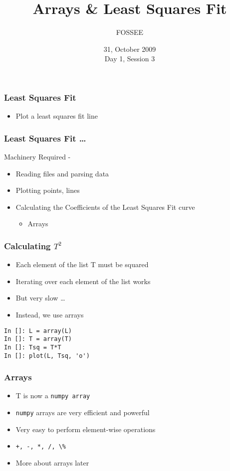 \documentclass[14pt,compress]{beamer}
\title[]{Arrays \& Least Squares Fit}
\author[FOSSEE] {FOSSEE}
\institute[IIT Bombay] {Department of Aerospace Engineering\\IIT Bombay}
\date[] {31, October 2009\\Day 1, Session 3}
\newcommand{\typ}[1]{\lstinline{#1}}
\begin{document}
\begin{frame}
  \maketitle
\end{frame}



\begin{frame}
\frametitle{Least Squares Fit}
\begin{itemize}
\item Plot a least squares fit line
\end{itemize}
\end{frame}

\begin{frame}[fragile]
\frametitle{Least Squares Fit \ldots}
Machinery Required -
\begin{itemize}
\item Reading files and parsing data
\item Plotting points, lines
\item Calculating the Coefficients of the Least Squares Fit curve
\begin{itemize}
  \item Arrays
\end{itemize}
\end{itemize}
\end{frame}


\begin{frame}[fragile]
\frametitle{Calculating $T^2$}
\begin{itemize}
\item Each element of the list T must be squared
\item Iterating over each element of the list works
\item But very slow \ldots
\item Instead, we use arrays
\end{itemize}
\begin{lstlisting}
In []: L = array(L)
In []: T = array(T)
In []: Tsq = T*T
In []: plot(L, Tsq, 'o')
\end{lstlisting}
\end{frame}

\begin{frame}[fragile]
\frametitle{Arrays}
\begin{itemize}
\item T is now a \typ{numpy array}
\item \typ{numpy} arrays are very efficient and powerful 
\item Very easy to perform element-wise operations
\item \typ{+, -, *, /, \%}
\item More about arrays later
\end{itemize}
\end{frame}
\end{document}
